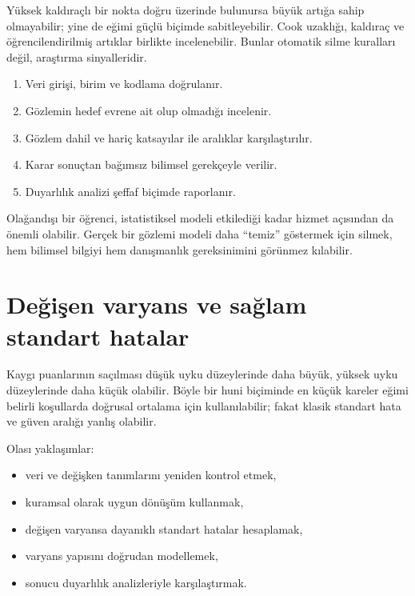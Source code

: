 Yüksek kaldıraçlı bir nokta doğru üzerinde bulunursa büyük artığa sahip
olmayabilir; yine de eğimi güçlü biçimde sabitleyebilir. Cook uzaklığı, kaldıraç
ve öğrencilendirilmiş artıklar birlikte incelenebilir. Bunlar otomatik silme
kuralları değil, araştırma sinyalleridir.

\begin{enumerate}
  \item Veri girişi, birim ve kodlama doğrulanır.
  \item Gözlemin hedef evrene ait olup olmadığı incelenir.
  \item Gözlem dahil ve hariç katsayılar ile aralıklar karşılaştırılır.
  \item Karar sonuçtan bağımsız bilimsel gerekçeyle verilir.
  \item Duyarlılık analizi şeffaf biçimde raporlanır.
\end{enumerate}

\begin{researchbox}
Olağandışı bir öğrenci, istatistiksel modeli etkilediği kadar hizmet açısından
da önemli olabilir. Gerçek bir gözlemi modeli daha ``temiz'' göstermek için
silmek, hem bilimsel bilgiyi hem danışmanlık gereksinimini görünmez kılabilir.
\end{researchbox}

\section{Değişen varyans ve sağlam standart hatalar}

Kaygı puanlarının saçılması düşük uyku düzeylerinde daha büyük, yüksek uyku
düzeylerinde daha küçük olabilir. Böyle bir huni biçiminde en küçük kareler
eğimi belirli koşullarda doğrusal ortalama için kullanılabilir; fakat klasik
standart hata ve güven aralığı yanlış olabilir.

Olası yaklaşımlar:

\begin{itemize}
  \item veri ve değişken tanımlarını yeniden kontrol etmek,
  \item kuramsal olarak uygun dönüşüm kullanmak,
  \item değişen varyansa dayanıklı standart hatalar hesaplamak,
  \item varyans yapısını doğrudan modellemek,
  \item sonucu duyarlılık analizleriyle karşılaştırmak.
\end{itemize}

